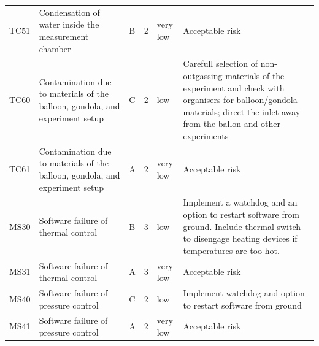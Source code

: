 \documentclass[
  a4paper,
  11pt,
  openany,
  parskip,
  toc=totoc,
  listof=totoc,
  bibliography=totoc
]{scrreprt}
\begin{document}
\begin{longtable}{L{1.5cm}L{3cm}L{1cm}L{1cm}L{2cm}L{6cm}}
 TC51 & Condensation of water inside the measurement chamber & B & 2 & very low & Acceptable risk \\
 TC60 & Contamination due to materials of the balloon, gondola, and experiment setup & C & 2 & low & Carefull selection of non-outgassing materials of the experiment and check with organisers for balloon/gondola materials; direct the inlet away from the ballon and other experiments\\
 TC61 & Contamination due to materials of the balloon, gondola, and experiment setup & A & 2 & very low & Acceptable risk\\
 MS30 & Software failure of thermal control & B & 3 & low & Implement a watchdog and an option to restart software from ground. Include thermal switch to disengage heating devices if temperatures are too hot. \\
 MS31 & Software failure of thermal control & A & 3 & very low & Acceptable risk \\
 MS40 & Software failure of pressure control & C & 2 & low & Implement watchdog and option to restart software from ground \\
 MS41 & Software failure of pressure control & A & 2 & very low & Acceptable risk \\
\end{longtable}
\end{document}
